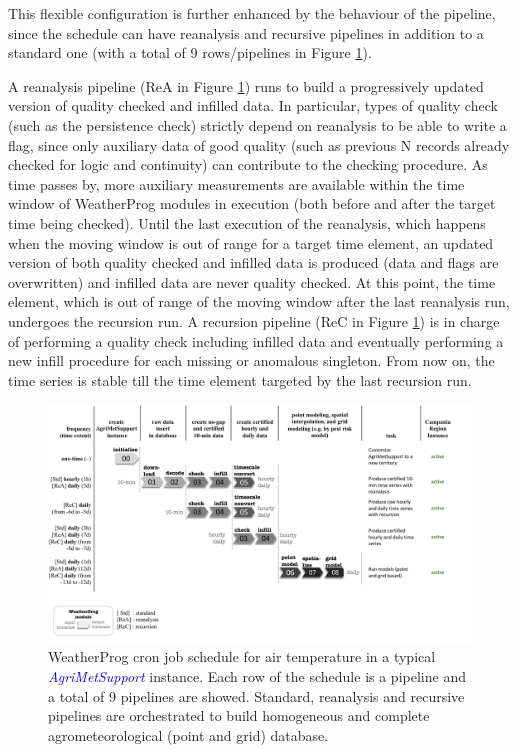 \documentclass[authoryear,preprint,review,12pt]{elsarticle}
\newcommand{\update}[1]{\emph{\textcolor{blue}{#1}}}
\newcommand{\gci}{\update{AgriMetSupport}\xspace}
\begin{document}
This flexible configuration is further enhanced by the behaviour of the pipeline, since the schedule can have reanalysis and recursive pipelines in addition to a standard one (with a total of 9 rows/pipelines in Figure \ref{Fig:weatherprog:calls}).

A reanalysis pipeline (ReA in Figure \ref{Fig:weatherprog:calls}) runs to build a progressively updated version of quality checked and infilled data.
In particular, types of quality check (such as the persistence check) strictly depend on reanalysis to be able to write a flag, since only auxiliary data of good quality (such as previous N records already checked for logic and continuity) can contribute to the checking procedure.
As time passes by, more auxiliary measurements are available within the time window of WeatherProg modules in execution (both before and after the target time being checked). 
Until the last execution of the reanalysis, which happens when the moving window is out of range for a target time element, an updated version of both quality checked and infilled data is produced (data and flags are overwritten) and infilled data are never quality checked.
At this point, the time element, which is out of range of the moving window after the last reanalysis run, undergoes the recursion run.
A recursion pipeline (ReC in Figure \ref{Fig:weatherprog:calls}) is in charge of performing a quality check including infilled data and eventually performing a new infill procedure for each missing or anomalous singleton.
From now on, the time series is stable till the time element targeted by the last recursion run.

\begin{figure}
	\centering
	\includegraphics[scale=.4]{figures/WeatherProg-schedule-fig.pdf}
	\caption{WeatherProg cron job schedule for air temperature in a typical \gci instance. Each row of the schedule is a pipeline and a total of 9 pipelines are showed. Standard, reanalysis and recursive pipelines are orchestrated to build homogeneous and complete agrometeorological (point and grid) database.}
	\label{Fig:weatherprog:calls}
\end{figure}
\end{document}

